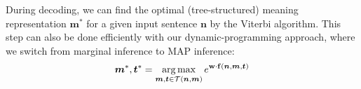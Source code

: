 During decoding, we can find the optimal (tree-structured) meaning representation $\boldsymbol{m}^*$ for a given  input sentence $\boldsymbol{n}$ by the Viterbi algorithm. 
This step can also be done efficiently with our dynamic-programming approach, where we switch from marginal inference to MAP inference:
\begin{equation}
\boldsymbol{m}^*, \boldsymbol{t}^* = \operatorname*{arg\,max}_{\boldsymbol{m}, \boldsymbol{t}\in\mathcal{T} (\boldsymbol{n}, \boldsymbol{m})} e ^{\mathbf{w} \cdot \mathbf{f} (\boldsymbol{n}, \boldsymbol{m}, \boldsymbol{t})}
\end{equation}

